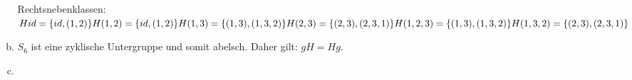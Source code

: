 \documentclass[a4paper]{scrartcl}
\begin{document}
\begin{enumerate}
\begin{enumerate}[a)]
Rechtsnebenklassen:\\
$Hid = \{ id , (1,2) \} \\
H(1,2) = \{ id , (1,2) \} \\
H(1,3) = \{ (1,3) , (1,3,2) \} \\
H(2,3) = \{ (2,3) , (2,3,1) \} \\
H(1,2,3) = \{ (1,3) , (1,3,2) \} \\
H(1,3,2) = \{ (2,3) , (2,3,1) \} $
\item
$S_6$ ist eine zyklische Untergruppe und somit abelsch. Daher gilt: 
$gH = Hg$.
\item 
\end{enumerate}
\end{enumerate}
\end{document}
